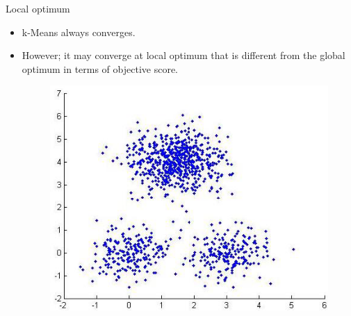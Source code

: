 \documentclass[serif, aspectratio=169]{beamer}
\begin{document}
\begin{frame}{Local optimum}
    \begin{itemize}
        \item k-Means always converges.
        \item However; it may converge at local optimum that is different from the global optimum in terms of objective score.
        \begin{figure}
            \centering
            \includegraphics[scale=0.55]{pic/original_data.png}
        \end{figure}
    \end{itemize}
\end{frame}
\end{document}
